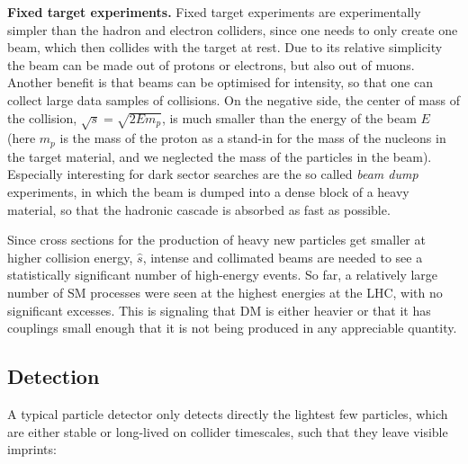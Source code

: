 \begin{description}
 \item  {\bf Fixed target experiments.} 
 Fixed target experiments are experimentally simpler than the hadron and electron colliders, since one needs to only create one beam, which then collides with the target at rest. Due to its relative simplicity the beam can be made out of protons or electrons, but also out of muons. Another benefit is that beams can be optimised for intensity, so that one can collect large data samples of collisions. On the negative side, the center of mass of the collision, $\sqrt{s}=\sqrt{2 E m_p}$, is much smaller than the energy of the beam $E$ (here $m_p$ is the mass of the proton as a stand-in for the mass of the nucleons in the target material, and we neglected the mass of the particles in the beam). Especially interesting for  dark sector searches  are the so called {\em beam dump} experiments, in which the beam is dumped into a dense block of a heavy material, so that the hadronic cascade is absorbed as fast as possible.
 
\end{description}

Since cross sections for the production of heavy new particles get smaller at higher collision energy, $\hat s$,  intense and collimated
beams are needed to see a statistically significant number of high-energy events.
So far, a relatively large number of SM processes were seen at the highest energies at the LHC, with no significant excesses. This is signaling that DM is either heavier or that it has couplings small enough that it is not being produced in any appreciable quantity.


\subsection{Detection}
A typical particle detector only detects directly the  lightest few particles, which are either stable or long-lived on collider timescales, such that they leave visible imprints:

